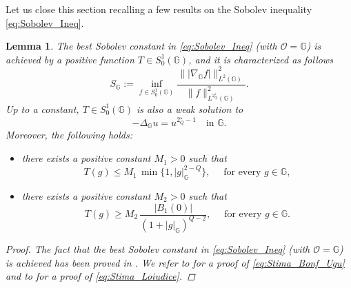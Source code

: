 \documentclass[11pt]{amsart}
\numberwithin{equation}{section} %
\newtheorem{lemma}[teo]{Lemma}
\theoremstyle{definition}
\begin{document}
\medskip

Let us close this section recalling a few results on the Sobolev inequality \eqref{eq:Sobolev_Ineq}.
\begin{lemma}
	The best Sobolev constant in \eqref{eq:Sobolev_Ineq} (with $\mathcal{O} = \mathbb{G}$) is achieved by a positive function $T \in S^{1}_{0}(\mathbb{G})$, and it is characterized as follows
	\begin{equation}\label{eq:def_best_constant}
		S_{\mathbb{G}} := \inf_{f\in S^{1}_{0}(\mathbb{G})} \dfrac{\| |\nabla_{\mathbb{G}}f| \|^{2}_{L^{2}(\mathbb{G})}}{	\|f\|^{2}_{L^{2_{Q}^{\star}}(\mathbb{G})}}.
	\end{equation}
	Up to a constant, $T \in S^{1}_{0}(\mathbb{G})$ is also a weak solution to 
	\begin{equation}\label{eq:Critical_PDE_in_G}
		-\Delta_{\mathbb{G}}u = u^{2^{\star}_{Q}-1} \quad \textrm{in } \mathbb{G}.
	\end{equation}
	Moreover, the following holds:
	\begin{itemize}
		\item there exists a positive constant $M_1>0$ such that 
		\begin{equation}\label{eq:Stima_Bonf_Ugu}
			T(g) \leq M_1 \, \min \{1, |g|_{\mathbb{G}}^{2-Q}\}, \quad \textrm{ for every } g \in \mathbb{G},
		\end{equation} 
		\item there exists a positive constant $M_2 >0$ such that
		\begin{equation}\label{eq:Stima_Loiudice}
			T(g) \geq M_2 \, \dfrac{|B_{1}(0)|}{(1+|g|_{\mathbb{G}})^{Q-2}}, \quad \textrm{ for every } g \in \mathbb{G}.
		\end{equation}
	\end{itemize}
	\begin{proof}
		The fact that the best Sobolev constant in \eqref{eq:Sobolev_Ineq} (with $\mathcal{O} = \mathbb{G}$) is achieved has been proved in \cite{GaroVa}. We refer to \cite[Theorem 3.4]{BoUg} for a proof of \eqref{eq:Stima_Bonf_Ugu} and to  \cite[Lemma 3.2]{Loiudice1} for a proof of \eqref{eq:Stima_Loiudice}.
	\end{proof}
\end{lemma}
\end{document}
